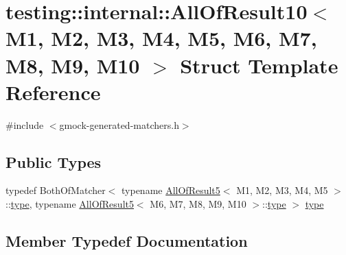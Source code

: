 \hypertarget{structtesting_1_1internal_1_1_all_of_result10}{}\section{testing\+::internal\+::All\+Of\+Result10$<$ M1, M2, M3, M4, M5, M6, M7, M8, M9, M10 $>$ Struct Template Reference}
\label{structtesting_1_1internal_1_1_all_of_result10}


{\ttfamily \#include $<$gmock-\/generated-\/matchers.\+h$>$}

\subsection*{Public Types}
\begin{DoxyCompactItemize}
\item 
typedef Both\+Of\+Matcher$<$ typename \mbox{\hyperlink{structtesting_1_1internal_1_1_all_of_result5}{All\+Of\+Result5}}$<$ M1, M2, M3, M4, M5 $>$\+::\mbox{\hyperlink{structtesting_1_1internal_1_1_all_of_result10_a48d6c6de6d0d5445b212119e1f536af5}{type}}, typename \mbox{\hyperlink{structtesting_1_1internal_1_1_all_of_result5}{All\+Of\+Result5}}$<$ M6, M7, M8, M9, M10 $>$\+::\mbox{\hyperlink{structtesting_1_1internal_1_1_all_of_result10_a48d6c6de6d0d5445b212119e1f536af5}{type}} $>$ \mbox{\hyperlink{structtesting_1_1internal_1_1_all_of_result10_a48d6c6de6d0d5445b212119e1f536af5}{type}}
\end{DoxyCompactItemize}


\subsection{Member Typedef Documentation}
\mbox{\label{structtesting_1_1internal_1_1_all_of_result10_a48d6c6de6d0d5445b212119e1f536af5}} 
